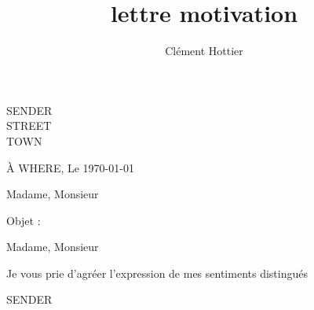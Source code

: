 \documentclass[12pt]{article}
\author{Clément Hottier}
\date{}
\title{lettre motivation}
\begin{document}
\setlength{\parindent}{0pt}
\setlength{\parskip}{8pt}
\pagestyle{empty}


\begin{minipage}{0.4\textwidth}
  SENDER \\
  STREET   \\
  TOWN  
\end{minipage}
\hfill
\begin{minipage}{0.4\textwidth}
  \begin{flushright}
    \`A WHERE, Le \today 
  \end{flushright}
\end{minipage}

\vspace{1cm}
\begin{flushright}
  Madame, Monsieur
\end{flushright}

\vspace{1cm}

Objet : 
\vspace{0.8cm}

Madame, Monsieur 




\vspace{0.5cm}
Je vous prie d'agréer l'expression 
de mes sentiments distingués

\vfill
\hspace{0.63\textwidth} SENDER 
\vfill
\end{document}

